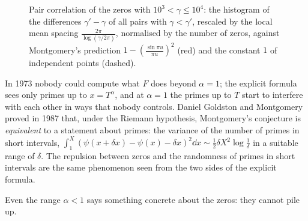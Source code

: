 \begin{figure}[ht]
\centering
{}
\caption{Pair correlation of the zeros with $10^3<\gamma\le10^4$: the histogram of the differences $\gamma'-\gamma$ of all pairs with $\gamma<\gamma'$, rescaled by the local mean spacing $\frac{2\pi}{\log(\gamma/2\pi)}$, normalised by the number of zeros, against Montgomery's prediction $1-(\frac{\sin\pi u}{\pi u})^2$ (red) and the constant $1$ of independent points (dashed).}
\label{fig:paircorr}
\end{figure}

\begin{beauty}
In 1973 nobody could compute what $F$ does beyond $\alpha=1$; the explicit formula sees only primes up to $x=T^\alpha$, and at $\alpha=1$ the primes up to $T$ start to interfere with each other in ways that nobody controls. Daniel Goldston and Montgomery proved in 1987 that, under the Riemann hypothesis, Montgomery's conjecture is \emph{equivalent} to a statement about primes: the variance of the number of primes in short intervals, $\int_1^X(\psi(x+\delta x)-\psi(x)-\delta x)^2\dd x\sim\frac12\delta X^2\log\frac1\delta$ in a suitable range of $\delta$. The repulsion between zeros and the randomness of primes in short intervals are the same phenomenon seen from the two sides of the explicit formula.
\end{beauty}

Even the range $\alpha<1$ says something concrete about the zeros: they cannot pile up.

